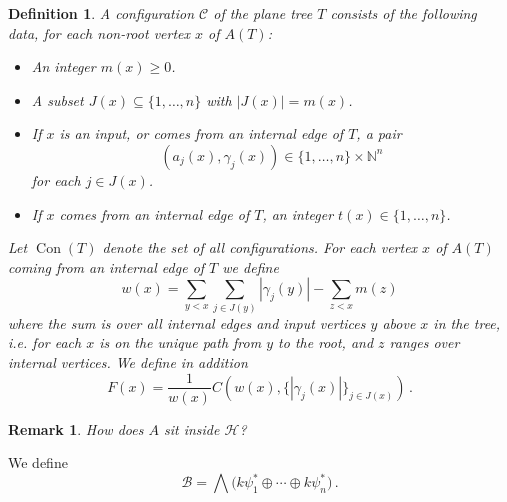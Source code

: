 \documentclass[english,letter paper,12pt,leqno]{article}
\theoremstyle{example}
\newtheorem{definition}[theorem]{Definition}
\newtheorem{remark}[theorem]{Remark}
\numberwithin{equation}{section}
\begin{document}
\begin{definition} A \emph{configuration} $\mathscr{C}$ of the plane tree $T$ consists of the following data, for each non-root vertex $x$ of $A(T)$:
\begin{itemize}
\item An integer $m(x) \ge 0$.
\item A subset $J(x) \subseteq \{ 1,\ldots, n \}$ with $|J(x)| = m(x)$. 
\item If $x$ is an input, or comes from an internal edge of $T$, a pair
\[
( a_j(x), \gamma_j(x) ) \in \{ 1, \ldots, n \} \times \mathbb{N}^n
\]
for each $j \in J(x)$.
\item If $x$ comes from an internal edge of $T$, an integer $t(x) \in \{1,\ldots,n\}$.
\end{itemize}
Let $\operatorname{Con}(T)$ denote the set of all configurations. For each vertex $x$ of $A(T)$ coming from an internal edge of $T$ we define
\[
w(x) = \sum_{y < x} \sum_{j \in J(y)} | \gamma_j(y) | - \sum_{z < x} m(z)
\]
where the sum is over all internal edges and input vertices $y$ above $x$ in the tree, i.e. for each $x$ is on the unique path from $y$ to the root, and $z$ ranges over internal vertices. We define in addition
\[
F(x) = \frac{1}{w(x)} C( w(x), \{ |\gamma_j(x)| \}_{j \in J(x)} )\,.
\]
\end{definition} 

\begin{remark} How does $A$ sit inside $\mathscr{H}$?
\end{remark}

We define
\[
\mathscr{B} = \bigwedge\big( k \psi_1^* \oplus \cdots \oplus k \psi_n^* \big)\,.
\]
\end{document}
